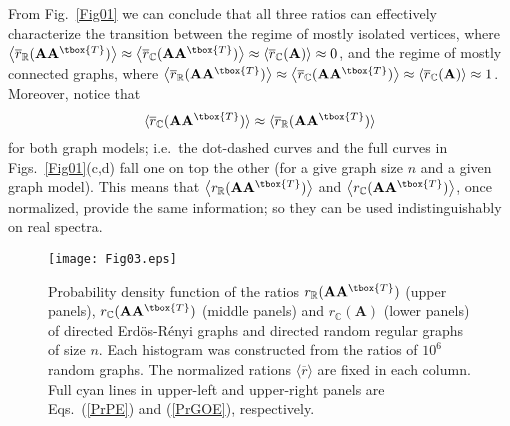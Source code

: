 From Fig.~\ref{Fig01} we can conclude that all three ratios can
effectively characterize the transition between the regime of mostly isolated vertices, where
$\left\langle \overline{r}_\mathbb{R}(\mathbf{A}\mathbf{A}^{\tbox{T}}) \right\rangle 
\approx \left\langle \overline{r}_\mathbb{C}(\mathbf{A}\mathbf{A}^{\tbox{T}}) \right\rangle \approx 
\left\langle \overline{r}_\mathbb{C}(\mathbf{A}) \right\rangle \approx 0$,
and the regime of mostly connected graphs, where
$\left\langle \overline{r}_\mathbb{R}(\mathbf{A}\mathbf{A}^{\tbox{T}}) \right\rangle 
\approx \left\langle \overline{r}_\mathbb{C}(\mathbf{A}\mathbf{A}^{\tbox{T}}) \right\rangle \approx 
\left\langle \overline{r}_\mathbb{C}(\mathbf{A}) \right\rangle \approx 1$.
Moreover, notice that
\begin{equation}
\langle \overline{r}_{\mathbb{C}}(\mathbf{A}\mathbf{A}^{\tbox{T}})\rangle \approx
\langle \overline{r}_{\mathbb{R}}(\mathbf{A}\mathbf{A}^{\tbox{T}})\rangle
\label{rCrA}
\end{equation}
for both graph models; i.e.~the dot-dashed curves and the full curves in Figs.~\ref{Fig01}(c,d) fall one 
on top the other (for a give graph size $n$ and a given graph model). 
This means that $\left\langle r_\mathbb{R}(\mathbf{A}\mathbf{A}^{\tbox{T}}) \right\rangle$ and 
$\left\langle r_\mathbb{C}(\mathbf{A}\mathbf{A}^{\tbox{T}}) \right\rangle$, once normalized, provide 
the same information; so they can be used indistinguishably on real spectra.



\begin{figure*}[!t]
\texttt{[image: Fig03.eps]}
\caption{Probability density function of the ratios 
$r_\mathbb{R}(\mathbf{A}\mathbf{A}^{\tbox{T}})$ (upper panels), 
$r_\mathbb{C}(\mathbf{A}\mathbf{A}^{\tbox{T}})$ (middle panels) and
$r_\mathbb{C}(\mathbf{A})$ (lower panels)
of directed Erd\"os-R\'enyi graphs and directed random regular graphs of size $n$.
Each histogram was constructed from the ratios of $10^6$ random graphs.
The normalized rations $\langle \overline{r}\rangle$ are fixed in each column.
Full cyan lines in upper-left and upper-right panels are 
Eqs.~(\ref{PrPE}) and (\ref{PrGOE}), respectively.}
\label{Fig03}
\end{figure*} 


